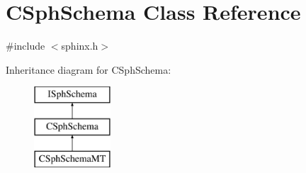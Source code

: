 \hypertarget{classCSphSchema}{\section{C\-Sph\-Schema Class Reference}
\label{classCSphSchema}
}


{\ttfamily \#include $<$sphinx.\-h$>$}

Inheritance diagram for C\-Sph\-Schema\-:\begin{figure}[H]
\begin{center}
\leavevmode
\includegraphics[height=3.000000cm]{classCSphSchema}
\end{center}
\end{figure}
